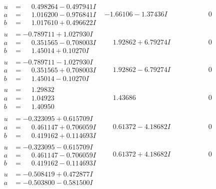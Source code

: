 \documentclass[1p]{elsarticle_modified}
\theoremstyle{definition}
\begin{document}
$$\begin{array}{c|c|c}
\begin{aligned}
u &= \phantom{-}0.498264 - 0.497941 I \\
a &= \phantom{-}1.016200 - 0.976841 I \\
b &= \phantom{-}1.017610 + 0.496622 I\end{aligned}
 & -1.66106 - 1.37436 I & \phantom{-0.000000 } 0 \\ \hline\begin{aligned}
u &= -0.789711 + 1.027930 I \\
a &= \phantom{-}0.351565 - 0.708003 I \\
b &= \phantom{-}1.45014 + 0.10270 I\end{aligned}
 & \phantom{-}1.92862 + 6.79274 I & \phantom{-0.000000 } 0 \\ \hline\begin{aligned}
u &= -0.789711 - 1.027930 I \\
a &= \phantom{-}0.351565 + 0.708003 I \\
b &= \phantom{-}1.45014 - 0.10270 I\end{aligned}
 & \phantom{-}1.92862 - 6.79274 I & \phantom{-0.000000 } 0 \\ \hline\begin{aligned}
u &= \phantom{-}1.29832\phantom{ +0.000000I} \\
a &= \phantom{-}1.04923\phantom{ +0.000000I} \\
b &= \phantom{-}1.40950\phantom{ +0.000000I}\end{aligned}
 & \phantom{-}1.43686\phantom{ +0.000000I} & \phantom{-0.000000 } 0 \\ \hline\begin{aligned}
u &= -0.323095 + 0.615709 I \\
a &= \phantom{-}0.461147 + 0.706059 I \\
b &= \phantom{-}0.419162 + 0.114693 I\end{aligned}
 & \phantom{-}0.61372 - 4.18682 I & \phantom{-0.000000 } 0 \\ \hline\begin{aligned}
u &= -0.323095 - 0.615709 I \\
a &= \phantom{-}0.461147 - 0.706059 I \\
b &= \phantom{-}0.419162 - 0.114693 I\end{aligned}
 & \phantom{-}0.61372 + 4.18682 I & \phantom{-0.000000 } 0 \\ \hline\begin{aligned}
u &= -0.508419 + 0.472877 I \\
a &= -0.503800 - 0.581500 I \\

\end{aligned}
\end{array}$$
\end{document}
